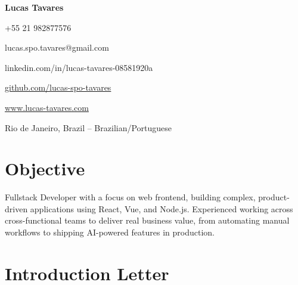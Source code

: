 \documentclass[letterpaper,11pt]{article}
\begin{document}
\begin{center}
  {\Huge \textbf{Lucas Tavares}}
\end{center}

\begin{center}
  +55 21 982877576
\end{center}

\begin{center}
  lucas.spo.tavares@gmail.com
\end{center}

\begin{center}
  linkedin.com/in/lucas-tavares-08581920a
\end{center}

\begin{center}
  \href{https://github.com/lucas-spo-tavares}{github.com/lucas-spo-tavares}
\end{center}

\begin{center}
  \href{https://www.lucas-tavares.com}{www.lucas-tavares.com}
\end{center}

\begin{center}
  Rio de Janeiro, Brazil -- Brazilian/Portuguese
\end{center}

\vspace{4pt}

\section{Objective}

\vspace{4pt}
\small{Fullstack Developer with a focus on web frontend, building complex, product-driven applications using React, Vue, and Node.js. Experienced working across cross-functional teams to deliver real business value, from automating manual workflows to shipping AI-powered features in production.}
\vspace{4pt}

\section{Introduction Letter}
\end{document}
